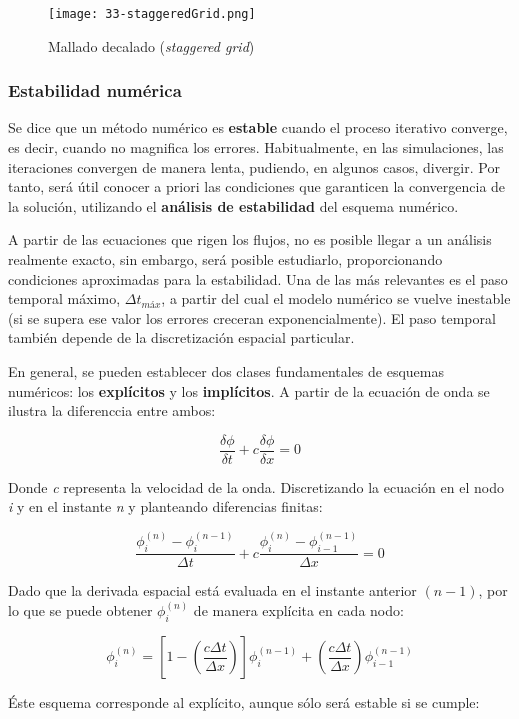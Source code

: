 \begin{figure}
\centering
\texttt{[image: 33-staggeredGrid.png]}
\caption{Mallado decalado (\emph{staggered grid})}
\label{fig:staggeredGrid}
\end{figure}

\subsubsection{Estabilidad numérica}\label{header-n218}

Se dice que un método numérico es \textbf{estable} cuando el proceso
iterativo converge, es decir, cuando no magnifica los errores.
Habitualmente, en las simulaciones, las iteraciones convergen de manera
lenta, pudiendo, en algunos casos, divergir. Por tanto, será útil
conocer a priori las condiciones que garanticen la convergencia de la
solución, utilizando el \textbf{análisis de estabilidad} del esquema
numérico.

A partir de las ecuaciones que rigen los flujos, no es posible llegar a
un análisis realmente exacto, sin embargo, será posible estudiarlo,
proporcionando condiciones aproximadas para la estabilidad. Una de las
más relevantes es el paso temporal máximo, \(\Delta t_{máx}\), a partir
del cual el modelo numérico se vuelve inestable (si se supera ese valor
los errores creceran exponencialmente). El paso temporal también depende
de la discretización espacial particular.

En general, se pueden establecer dos clases fundamentales de esquemas
numéricos: los \textbf{explícitos} y los \textbf{implícitos}. A partir
de la ecuación de onda se ilustra la diferenccia entre ambos:

\[\frac{\delta\phi}{\delta t}+c\frac{\delta\phi}{\delta x}=0\]

Donde \emph{c} representa la velocidad de la onda. Discretizando la
ecuación en el nodo \emph{i} y en el instante \emph{n} y planteando
diferencias finitas:

\[\frac{\phi_i^{(n)}-\phi_i^{(n-1)}}{\Delta t}+c\frac{\phi_i^{(n)}-\phi_{i-1}^{(n-1)}}{\Delta x}=0\]

Dado que la derivada espacial está evaluada en el instante anterior
\((n-1)\), por lo que se puede obtener \(\phi_i^{(n)}\) de manera
explícita en cada nodo:

\[\phi_i^{(n)}=\left[1-\left(\frac{c\Delta t}{\Delta x}\right)\right]\phi_i^{(n-1)}+\left(\frac{c \Delta t}{\Delta x}\right)\phi_{i-1}^{(n-1)}\]

Éste esquema corresponde al explícito, aunque sólo será estable si se
cumple:

